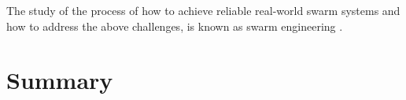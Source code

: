 The study of the process of how to achieve reliable real-world swarm systems and how to address the above challenges, is known as swarm engineering \cite{brambilla2013swarm}. %




\section{Summary}
\label{sec:first:summary}



